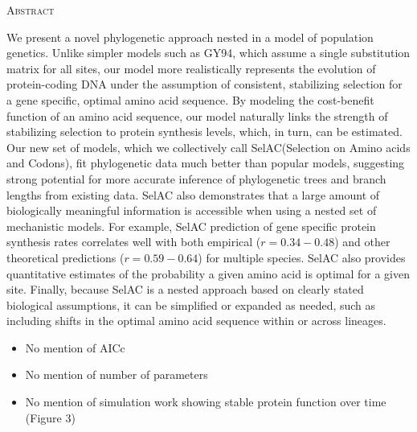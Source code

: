 \documentclass[12pt,letterpaper,fleqn]{article}
\renewcommand{\section}[1]{%
\bigskip
\begin{center}
\begin{Large}
\normalfont\scshape #1
\medskip
\end{Large}
\end{center}}
\newcommand{\selac}{SelAC\xspace}
\begin{document}


\newpage

\section{Abstract}
We present a novel phylogenetic approach nested in a model of population genetics.
Unlike simpler models such as GY94, which assume a single substitution matrix for all sites, our model more realistically represents the evolution of protein-coding DNA under the assumption of consistent, stabilizing selection for a gene specific, optimal amino acid sequence.
By modeling the cost-benefit function of an amino acid sequence, our model naturally links the strength of stabilizing selection to protein synthesis levels, which, in turn, can be estimated.
Our new set of models, which we collectively call \selac (Selection on Amino acids and Codons), fit phylogenetic data much better than popular models, suggesting strong potential for more accurate inference of phylogenetic trees and branch lengths from existing data.
\selac also demonstrates that a large amount of biologically meaningful information is accessible when using a nested set of mechanistic models.
For example, \selac prediction of gene specific protein synthesis rates correlates well with both empirical ($r = 0.34-0.48$) and other theoretical predictions ($r=0.59-0.64$) for multiple species.
\selac also provides quantitative estimates of the probability a given amino acid is optimal for a given site.
Finally, because SelAC is a nested approach based on clearly stated biological assumptions, it can be simplified or expanded as needed, such as including shifts in the optimal amino acid sequence within or across lineages. 

\begin{itemize}
\item No mention of AICc
\item No mention of number of parameters
\item No mention of simulation work showing stable protein function over time (Figure 3)
\end{itemize}
\newpage
\end{document}
